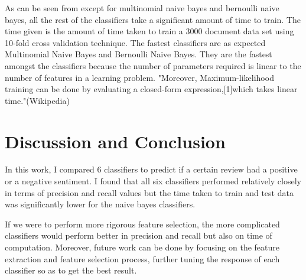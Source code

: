 \documentclass{article} %
\begin{document}
As can be seen from  except for multinomial naive bayes and bernoulli naive bayes, all the rest of the classifiers  take a significant amount of time to train. The time given is the amount of time taken to train a 3000 document data set using 10-fold cross validation technique. The fastest classifiers are as expected Multinomial Naive Bayes and Bernoulli Naive Bayes. They are the fastest amongst the classifiers because the number of parameters required is linear to the number of features in a learning problem. "Moreover,  Maximum-likelihood training can be done by evaluating a closed-form expression,[1]which takes linear time."(Wikipedia)\cite{Russell2003}







\section{Discussion and Conclusion}
In this work, I compared 6 classifiers to predict if a certain review had a positive or a negative sentiment. I found that all six classifiers performed relatively closely in terms of precision and recall values but the time taken to train and test data was significantly lower for the naive bayes classifiers. 

If we were to perform more rigorous feature selection, the more complicated classifiers would perform better in precision and recall but also on time of computation. Moreover, future work can be done by focusing on the feature extraction and feature selection process, further tuning the response of each classifier so as to get the best result.  




\end{document}
